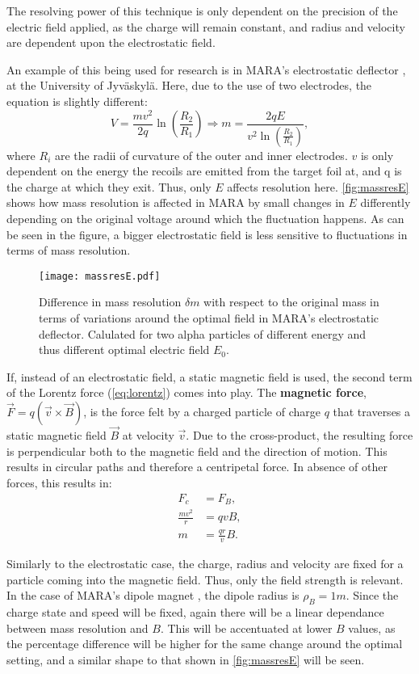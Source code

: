 The resolving power of this technique is only dependent on the precision of the electric field applied, as the charge will remain constant, and radius and velocity are dependent upon the electrostatic field. 

An example of this being used for research is in MARA's electrostatic deflector \cite{saren}, at the University of Jyväskylä. Here, due to the use of two electrodes, the equation is slightly different:
\begin{equation}
    \label{eq:maraE}
    V = \frac{mv^2}{2q}\ln{\left(\frac{R_2}{R_1}\right)} \Rightarrow m = \frac{2qE}{v^2 \ln{\left(\frac{R_2}{R_1}\right)}},
\end{equation} where $R_i$ are the radii of curvature of the outer and inner electrodes. $v$ is only dependent on the energy the recoils are emitted from the target foil at, and q is the charge at which they exit. Thus, only $E$ affects resolution here. \autoref{fig:massresE} shows how mass resolution is affected in MARA by small changes in $E$ differently depending on the original voltage around which the fluctuation happens. As can be seen in the figure, a bigger electrostatic field is less sensitive to fluctuations in terms of mass resolution.

\begin{figure}[H]
    \centering
     \texttt{[image: massresE.pdf]}
     \caption{Difference in mass resolution $\delta m$ with respect to the original mass in terms of variations around the optimal field in MARA's electrostatic deflector. Calulated for two alpha particles of different energy and thus different optimal electric field $E_0$.}
     \label{fig:massresE}
 \end{figure}

If, instead of an electrostatic field, a static magnetic field is used, the second term of the Lorentz force (\autoref{eq:lorentz}) comes into play. The \textbf{magnetic force}, $\vec{F} = q(\vec v \times \vec B)$, is the force felt by a charged particle of charge $q$ that traverses a static magnetic field $\vec B$ at velocity $\vec v$. Due to the cross-product, the resulting force is perpendicular both to the magnetic field and the direction of motion. This results in circular paths and therefore a centripetal force. In absence of other forces, this results in:
\begin{align}
    \label{eq:centripetalB}
    F_c &= F_B, \\
    \frac{mv^2}{r} &= qvB, \\
    m &= \frac{qr}{v}B.
\end{align}

Similarly to the electrostatic case, the charge, radius and velocity are fixed for a particle coming into the magnetic field. Thus, only the field strength is relevant. In the case of MARA's dipole magnet \cite{saren}, the dipole radius is $\rho_B = 1\unit{m}$. Since the charge state and speed will be fixed, again there will be a linear dependance between mass resolution and $B$. This will be accentuated at lower $B$ values, as the percentage difference will be higher for the same change around the optimal setting, and a similar shape to that shown in \autoref{fig:massresE} will be seen.

